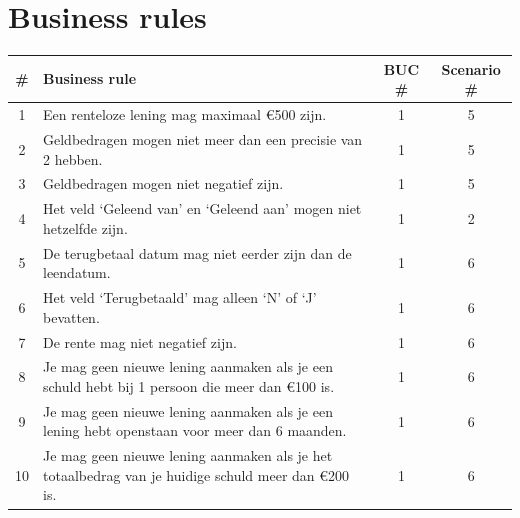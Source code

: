 \documentclass[11pt,english]{article}
\begin{document}
	\section{Business rules}
	\begin{tabularx}{\textwidth}{ | c | X | c | c | }
		\hline
		\textbf{\#} & \textbf{Business rule} & \textbf{BUC \#} & \textbf{Scenario \#} \\ \hline
		1 & Een renteloze lening mag maximaal \euro 500 zijn. & 1 & 5 \\ \hline
		2 & Geldbedragen mogen niet meer dan een precisie van 2 hebben. & 1 & 5 \\ \hline
		3 & Geldbedragen mogen niet negatief zijn. & 1 & 5 \\ \hline
		4 & Het veld `Geleend van' en `Geleend aan' mogen niet hetzelfde zijn. & 1 & 2 \\ \hline
		5 & De terugbetaal datum mag niet eerder zijn dan de leendatum. & 1 & 6 \\ \hline
		6 & Het veld `Terugbetaald' mag alleen `N' of `J' bevatten. & 1 & 6 \\ \hline
		7 & De rente mag niet negatief zijn. & 1 & 6 \\ \hline
		8 & Je mag geen nieuwe lening aanmaken als je een schuld hebt bij 1 persoon die meer dan \euro 100 is. & 1 & 6 \\ \hline
		9 & Je mag geen nieuwe lening aanmaken als je een lening hebt openstaan voor meer dan 6 maanden. & 1 & 6 \\ \hline
		10 & Je mag geen nieuwe lening aanmaken als je het totaalbedrag van je huidige schuld meer dan \euro 200 is. & 1 & 6 \\ \hline
	\end{tabularx}
\end{document}
